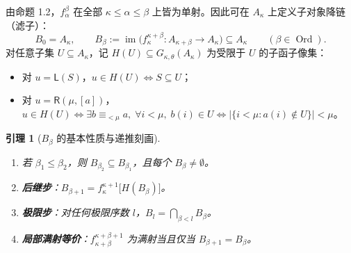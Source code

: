 \documentclass[11pt,a4paper]{ctexart}
\theoremstyle{definition}
\theoremstyle{plain}
\newtheorem{lemma}[definition]{引理}
\newcommand{\im}{\operatorname{im}}
\newcommand{\Ord}{\operatorname{Ord}}
\begin{document}
由命题 1.2，$f_\alpha^\beta$ 在全部 $\kappa \le \alpha \le \beta$ 上皆为单射。因此可在 $A_\kappa$ 上定义子对象降链（滤子）：
\[
  B_0 = A_\kappa, \qquad B_\beta := \im\bigl(f_\kappa^{\kappa+\beta} : A_{\kappa+\beta} \to A_\kappa\bigr) \subseteq A_\kappa \qquad (\beta \in \Ord).
\]
对任意子集 $U \subseteq A_\kappa$，记 $H(U) \subseteq G_{\kappa,\theta}(A_\kappa)$ 为受限于 $U$ 的子函子像集：
\begin{itemize}[leftmargin=2em]
  \item 对 $u = \mathsf{L}(S)$，$u \in H(U) \iff S \subseteq U$；
  \item 对 $u = \mathsf{R}(\mu, [a])$，$u \in H(U) \iff \exists b \equiv_{<\mu} a,\; \forall i < \mu,\; b(i) \in U \iff \bigl|\{ i < \mu : a(i) \notin U \}\bigr| < \mu$。
\end{itemize}

\begin{lemma}[$B_\beta$ 的基本性质与递推刻画]
\begin{enumerate}[label=(\arabic*)]
  \item 若 $\beta_1 \le \beta_2$，则 $B_{\beta_2} \subseteq B_{\beta_1}$，且每个 $B_\beta \neq \emptyset$。
  \item \textbf{后继步}：$B_{\beta+1} = f_\kappa^{\kappa+1}\bigl[H(B_\beta)\bigr]$。
  \item \textbf{极限步}：对任何极限序数 $l$，$B_l = \bigcap_{\beta < l} B_\beta$。
  \item \textbf{局部满射等价}：$f_{\kappa+\beta}^{\kappa+\beta+1}$ 为满射当且仅当 $B_{\beta+1} = B_\beta$。
\end{enumerate}
\end{lemma}
\end{document}
